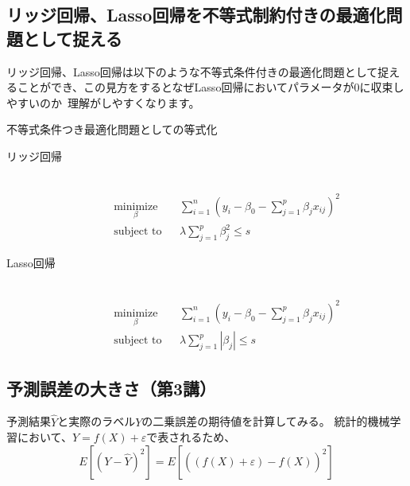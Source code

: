 \documentclass[uplatex]{jsarticle}
\begin{document}
\subsection{リッジ回帰、Lasso回帰を不等式制約付きの最適化問題として捉える}
リッジ回帰、Lasso回帰は以下のような不等式条件付きの最適化問題として捉えることができ、この見方をするとなぜLasso回帰においてパラメータが0に収束しやすいのか\
理解がしやすくなります。

\begin{itembox}[l]{不等式条件つき最適化問題としての等式化}
  \begin{description}
    \item[リッジ回帰]\mbox{}\\
    \begin{equation*}
      \begin{aligned}
      & \underset{\beta}{\text{minimize}}
      & &\displaystyle{\sum_{i=1}^n \left(y_i - \beta_0 - \sum_{j=1}^p \beta_jx_{ij}\right)^2 }  \\
      & \text{subject to}
      & & \lambda \sum_{j=1}^p \beta_j^2 \leq s
      \end{aligned}
    \end{equation*}
    \item[Lasso回帰]\mbox{}\\
      \begin{equation*}
        \begin{aligned}
        & \underset{\beta}{\text{minimize}}
        & &\displaystyle{\sum_{i=1}^n \left(y_i - \beta_0 - \sum_{j=1}^p \beta_jx_{ij}\right)^2 }  \\
        & \text{subject to}
        & & \lambda \sum_{j=1}^p |\beta_j| \leq s
        \end{aligned}
      \end{equation*}
  \end{description}
\end{itembox}
\subsection{予測誤差の大きさ（第3講）}
予測結果$\hat{Y}$と実際のラベル$Y$の二乗誤差の期待値を計算してみる。
統計的機械学習において、$Y = f(X) + \varepsilon$で表されるため、
$$E[(Y - \hat{Y})^2] = E[((f(X) + \varepsilon) - \hat{f}(X))^2]$$
\end{document}
